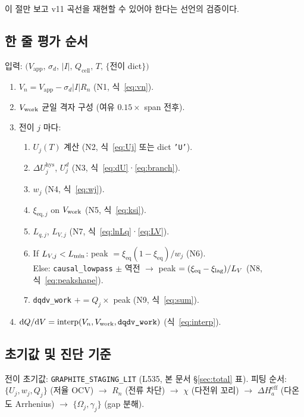 \documentclass[11pt,a4paper]{article}
\newcommand{\dd}{\mathrm{d}}
\newcommand{\eff}{\mathrm{eff}}
\newcommand{\eq}{\mathrm{eq}}
\newcommand{\app}{\mathrm{app}}
\newcommand{\cell}{\mathrm{cell}}
\newcommand{\hys}{\mathrm{hys}}
\begin{document}
이 절만 보고 v11 곡선을 재현할 수 있어야 한다는 선언의 검증이다.

\subsection{한 줄 평가 순서}

입력: $(V_\app,\,\sigma_d,\,|I|,\,Q_\cell,\,T,\,\{$전이 dict$\})$

\begin{enumerate}[label=\textbf{S\arabic*.},leftmargin=2.2em,itemsep=2pt]
\item $V_n = V_\app - \sigma_d|I|R_n$ (N1, 식~\eqref{eq:vn}).
\item $V_{\rm work}$ 균일 격자 구성 (여유 $0.15\times$ span 전후).
\item 전이 $j$ 마다:
  \begin{enumerate}[label=(\alph*),itemsep=0pt]
  \item $U_j(T)$ 계산 (N2, 식~\eqref{eq:Uj} 또는 dict \texttt{'U'}).
  \item $\Delta U_j^\hys$, $U_j^d$ (N3, 식~\eqref{eq:dU}·\eqref{eq:branch}).
  \item $w_j$ (N4, 식~\eqref{eq:wj}).
  \item $\xi_{\eq,j}$ on $V_{\rm work}$ (N5, 식~\eqref{eq:ksi}).
  \item $L_{q,j}$, $L_{V,j}$ (N7, 식~\eqref{eq:lnLq}·\eqref{eq:LV}).
  \item If $L_{V,j} < L_{\rm min}$: peak $=\xi_{\eq}(1-\xi_{\eq})/w_j$ (N6).\\
        Else: \texttt{causal\_lowpass} $\pm$ 역전 $\to$ peak $=(\xi_{\eq}-\xi_{\rm lag})/L_V$ (N8, 식~\eqref{eq:peakshape}).
  \item \texttt{dqdv\_work} $+= Q_j\times$ peak (N9, 식~\eqref{eq:sum}).
  \end{enumerate}
\item $\dd Q/\dd V = \mathrm{interp}(V_n, V_{\rm work}, \texttt{dqdv\_work})$ (식~\eqref{eq:interp}).
\end{enumerate}

\subsection{초기값 및 진단 기준}

전이 초기값: \texttt{GRAPHITE\_STAGING\_LIT} (L535, 본 문서 \S\ref{sec:total} 표).
피팅 순서: $\{U_j,w_j,Q_j\}$ (저율 OCV) $\to$ $R_n$ (전류 차단) $\to$ $\chi$ (다전위 꼬리)
$\to$ $\Delta H_a^\eff$ (다온도 Arrhenius) $\to$ $\{\Omega_j,\gamma_j\}$ (gap 분해).
\end{document}
